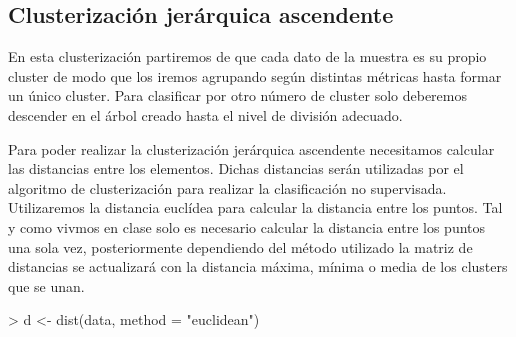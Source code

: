\documentclass [a4paper] {article}
\begin{document}
\subsection{Clusterización jerárquica ascendente}
En esta clusterización partiremos de que cada dato de la muestra es su propio cluster de modo que los iremos agrupando según distintas métricas hasta formar un único cluster.
Para clasificar por otro número de cluster solo deberemos descender en el árbol creado hasta el nivel de división adecuado.

Para poder realizar la clusterización jerárquica ascendente necesitamos calcular las distancias entre los elementos.
Dichas distancias serán utilizadas por el algoritmo de clusterización para realizar la clasificación no supervisada.
Utilizaremos la distancia euclídea para calcular la distancia entre los puntos.
Tal y como vivmos en clase solo es necesario calcular la distancia entre los puntos una sola vez,
posteriormente dependiendo del método utilizado la matriz de distancias se actualizará con la distancia máxima, mínima o media de los clusters que se unan.
\begin{Schunk}
\begin{Sinput}
> d <- dist(data, method = "euclidean")
\end{Sinput}
\end{Schunk}
\end{document}

